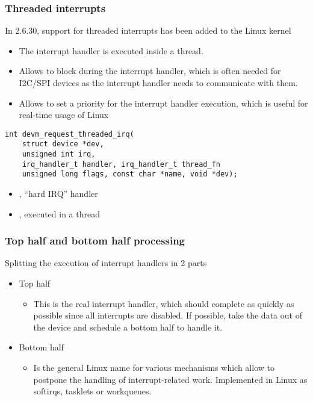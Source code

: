 \begin{frame}[fragile]
  \frametitle{Threaded interrupts}
  In 2.6.30, support for threaded interrupts has been added to
  the Linux kernel
  \begin{itemize}
  \item The interrupt handler is executed inside a thread.
  \item Allows to block during the interrupt handler, which is often
        needed for I2C/SPI devices as the interrupt handler needs to
        communicate with them.
  \item Allows to set a priority for the interrupt handler
        execution, which is useful for real-time usage of Linux
  \end{itemize}
  \begin{verbatim}
int devm_request_threaded_irq(
    struct device *dev,
    unsigned int irq,
    irq_handler_t handler, irq_handler_t thread_fn
    unsigned long flags, const char *name, void *dev);
  \end{verbatim}
  \begin{itemize}
  \item {}, ``hard IRQ'' handler
  \item {}, executed in a thread
  \end{itemize}
\end{frame}

\begin{frame}
  \frametitle{Top half and bottom half processing}
  Splitting the execution of interrupt handlers in 2 parts
  \begin{itemize}
  \item Top half
    \begin{itemize}
    \item This is the real interrupt handler, which should complete
      as quickly as possible since all interrupts are disabled. If
      possible, take the data out of the device and schedule a
      bottom half to handle it.
    \end{itemize}
  \item Bottom half
    \begin{itemize}
    \item Is the general Linux name for various mechanisms which
      allow to postpone the handling of interrupt-related
      work. Implemented in Linux as softirqs, tasklets or
      workqueues.
    \end{itemize}
  \end{itemize}
\end{frame}

